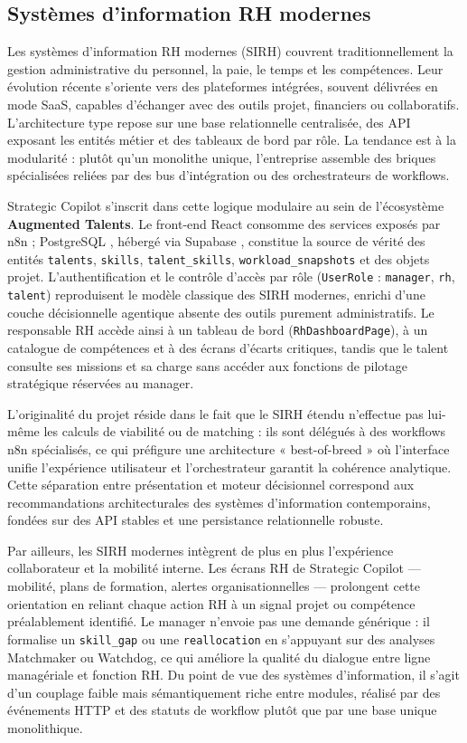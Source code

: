 \subsection{Systèmes d'information RH modernes}

Les systèmes d'information RH modernes (SIRH) couvrent traditionnellement la gestion administrative du personnel, la paie, le temps et les compétences. Leur évolution récente s'oriente vers des plateformes intégrées, souvent délivrées en mode SaaS, capables d'échanger avec des outils projet, financiers ou collaboratifs. L'architecture type repose sur une base relationnelle centralisée, des API exposant les entités métier et des tableaux de bord par rôle. La tendance est à la modularité : plutôt qu'un monolithe unique, l'entreprise assemble des briques spécialisées reliées par des bus d'intégration ou des orchestrateurs de workflows.

Strategic Copilot s'inscrit dans cette logique modulaire au sein de l'écosystème \textbf{Augmented Talents}. Le front-end React \cite{react2024} consomme des services exposés par n8n \cite{n8n2025} ; PostgreSQL \cite{postgresql2025}, hébergé via Supabase \cite{supabase2025}, constitue la source de vérité des entités \texttt{talents}, \texttt{skills}, \texttt{talent\_skills}, \texttt{workload\_snapshots} et des objets projet. L'authentification et le contrôle d'accès par rôle (\texttt{UserRole} : \texttt{manager}, \texttt{rh}, \texttt{talent}) reproduisent le modèle classique des SIRH modernes, enrichi d'une couche décisionnelle agentique absente des outils purement administratifs. Le responsable RH accède ainsi à un tableau de bord (\texttt{RhDashboardPage}), à un catalogue de compétences et à des écrans d'écarts critiques, tandis que le talent consulte ses missions et sa charge sans accéder aux fonctions de pilotage stratégique réservées au manager.

L'originalité du projet réside dans le fait que le SIRH étendu n'effectue pas lui-même les calculs de viabilité ou de matching : ils sont délégués à des workflows n8n spécialisés, ce qui préfigure une architecture « best-of-breed » où l'interface unifie l'expérience utilisateur et l'orchestrateur garantit la cohérence analytique. Cette séparation entre présentation et moteur décisionnel correspond aux recommandations architecturales des systèmes d'information contemporains, fondées sur des API stables et une persistance relationnelle robuste.

Par ailleurs, les SIRH modernes intègrent de plus en plus l'expérience collaborateur et la mobilité interne. Les écrans RH de Strategic Copilot --- mobilité, plans de formation, alertes organisationnelles --- prolongent cette orientation en reliant chaque action RH à un signal projet ou compétence préalablement identifié. Le manager n'envoie pas une demande générique : il formalise un \texttt{skill\_gap} ou une \texttt{reallocation} en s'appuyant sur des analyses Matchmaker ou Watchdog, ce qui améliore la qualité du dialogue entre ligne managériale et fonction RH. Du point de vue des systèmes d'information, il s'agit d'un couplage faible mais sémantiquement riche entre modules, réalisé par des événements HTTP et des statuts de workflow plutôt que par une base unique monolithique.

